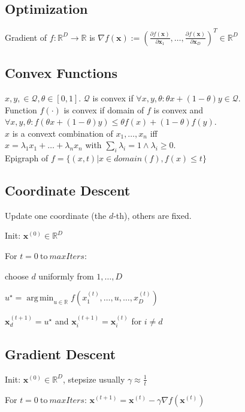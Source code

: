 \documentclass[a4paper, 11pt, landscape]{article}
\DeclareMathOperator*{\argmin}{arg\,min}
\begin{document}
\begin{multicols*}{3}
\section{Optimization}
Gradient of $f: \mathbb{R}^D \to \mathbb{R}$ is $\nabla f(\mathbf{x}) := \left( \frac{\partial f(\mathbf{x})}{\partial \mathbf{x}_1}, \ldots, \frac{\partial f(\mathbf{x})}{\partial \mathbf{x}_D} \right)^T \in \mathbb{R}^D$

\subsection{Convex Functions}
$x,y, \in \mathcal{Q}, \theta \in [0,1]$.
$\mathcal{Q}$ is convex if $\forall x,y,\theta : \theta x +(1-\theta) y \in \mathcal{Q}$.\\
Function $f(\cdot)$ is convex if domain of $f$ is convex and \\
$\forall x,y,\theta : f(\theta x+(1-\theta)y) \leq \theta f(x)+(1-\theta) f(y)$.\\
$x$ is a convext combination of $x_1,\dots,x_n$ iff\\ $x=\lambda_1x_1+\dots+\lambda_nx_n$ with $\sum_i\lambda_i=1 \wedge \lambda_i\geq 0$.\\
Epigraph of $f = \{(x,t) | x \in domain(f), f(x) \leq t\}$

\subsection{Coordinate Descent}
Update one coordinate (the $d$-th), others are fixed.
\begin{inparaenum}
	\item Init: $\mathbf{x}^{(0)} \in \mathbb{R}^D$
	\item For $t = 0 \ \text{to} \ \mathit{maxIters}$:
	\item choose $d$ uniformly from $1, \ldots, D$
	\item $u^\star = \argmin_{u \in \mathbb{R}} f(x_1^{(t)}, \ldots, u, \ldots, x_D^{(t)})$
	\item $\mathbf{x}_d^{(t+1)} = u^\star$ and $\mathbf{x}_i^{(t+1)} = \mathbf{x}_i^{(t)}$ for $i \neq d$
\end{inparaenum}

\subsection{Gradient Descent}
\begin{inparaenum}
	\item Init: $\mathbf{x}^{(0)} \in \mathbb{R}^D$, stepsize usually $\gamma \approx \frac{1}{t}$
	\item For $t = 0 \ \text{to} \ \mathit{maxIters}$: $\mathbf{x}^{(t+1)} = \mathbf{x}^{(t)} - \gamma \nabla f(\mathbf{x}^{(t)})$
\end{inparaenum}


\end{multicols*}
\end{document}
